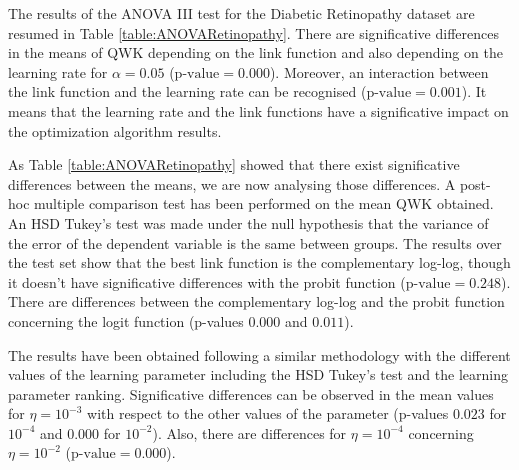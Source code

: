 \documentclass[journal]{IEEEtran}
\begin{document}
	The results of the ANOVA III test for the Diabetic Retinopathy dataset are resumed in Table \ref{table:ANOVARetinopathy}. There are significative differences in the means of QWK depending on the link function and also depending on the learning rate for $\alpha=0.05$ ($\text{p-value} = 0.000$). Moreover, an interaction between the link function and the learning rate can be recognised ($\text{p-value} = 0.001$). It means that the learning rate and the link functions have a significative impact on the optimization algorithm results.
	
	As Table \ref{table:ANOVARetinopathy} showed that there exist significative differences between the means, we are now analysing those differences. A post-hoc multiple comparison test has been performed on the mean QWK obtained. An HSD Tukey's test \cite{tukey1949comparing} was made under the null hypothesis that the variance of the error of the dependent variable is the same between groups. The results over the test set show that the best link function is the complementary log-log, though it doesn't have significative differences with the probit function ($\text{p-value} = 0.248$). There are differences between the complementary log-log and the probit function concerning the logit function (p-values $0.000$ and $0.011$).
	
	The results have been obtained following a similar methodology with the different values of the learning parameter including the HSD Tukey's test and the learning parameter ranking. Significative differences can be observed in the mean values for $\eta = 10^{-3}$ with respect to the other values of the parameter (p-values $0.023$ for $10^{-4}$ and $0.000$ for $10^{-2}$). Also, there are differences for $\eta = 10^{-4}$ concerning $\eta = 10^{-2}$ ($\text{p-value} = 0.000$).
	
\end{document}
